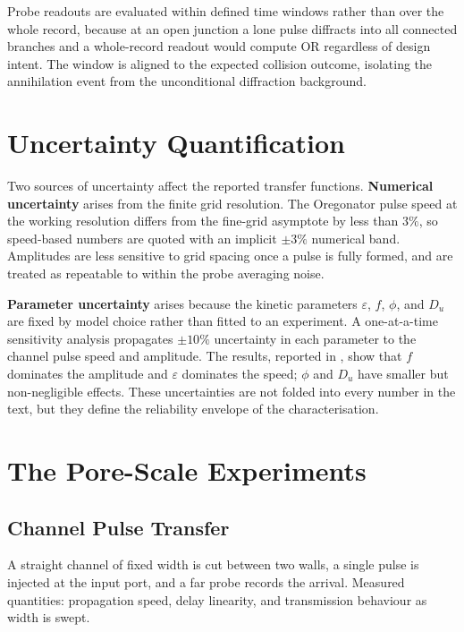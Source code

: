 Probe readouts are evaluated within defined time windows rather than over the whole record, because at an open junction a lone pulse diffracts into all connected branches and a whole-record readout would compute OR regardless of design intent.
The window is aligned to the expected collision outcome, isolating the annihilation event from the unconditional diffraction background.

\section{Uncertainty Quantification}
\label{sec:meth_uq}

Two sources of uncertainty affect the reported transfer functions.
\textbf{Numerical uncertainty} arises from the finite grid resolution.
The Oregonator pulse speed at the working resolution differs from the fine-grid asymptote by less than $3\%$, so speed-based numbers are quoted with an implicit $\pm 3\%$ numerical band.
Amplitudes are less sensitive to grid spacing once a pulse is fully formed, and are treated as repeatable to within the probe averaging noise.

\textbf{Parameter uncertainty} arises because the kinetic parameters $\varepsilon$, $f$, $\phi$, and $D_{u}$ are fixed by model choice rather than fitted to an experiment.
A one-at-a-time sensitivity analysis propagates $\pm 10\%$ uncertainty in each parameter to the channel pulse speed and amplitude.
The results, reported in , show that $f$ dominates the amplitude and $\varepsilon$ dominates the speed; $\phi$ and $D_{u}$ have smaller but non-negligible effects.
These uncertainties are not folded into every number in the text, but they define the reliability envelope of the characterisation.

\section{The Pore-Scale Experiments}
\label{sec:meth_experiments}

\subsection{Channel Pulse Transfer}
\label{sec:meth_exp_channel}

A straight channel of fixed width is cut between two walls, a single pulse is injected at the input port, and a far probe records the arrival.
Measured quantities: propagation speed, delay linearity, and transmission behaviour as width is swept.

